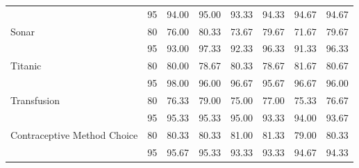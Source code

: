 \begin{table}[t]
\begin{tabular}{@{}lrrrrrrr@{}}
 & 95 & 94.00 & 95.00 & 93.33 & 94.33 & 94.67 & 94.67 \\[1pt]
Sonar & 80 & 76.00 & 80.33 & 73.67 & 79.67 & 71.67 & 79.67 \\
 & 95 & 93.00 & 97.33 & 92.33 & 96.33 & 91.33 & 96.33 \\[1pt]
Titanic & 80 & 80.00 & 78.67 & 80.33 & 78.67 & 81.67 & 80.67 \\
 & 95 & 98.00 & 96.00 & 96.67 & 95.67 & 96.67 & 96.00 \\[1pt]
Transfusion & 80 & 76.33 & 79.00 & 75.00 & 77.00 & 75.33 & 76.67 \\
 & 95 & 95.33 & 95.33 & 95.00 & 93.33 & 94.00 & 93.67 \\[1pt]
Contraceptive Method Choice & 80 & 80.33 & 80.33 & 81.00 & 81.33 & 79.00 & 80.33 \\
 & 95 & 95.67 & 95.33 & 93.33 & 93.33 & 94.67 & 94.33 \\
\hline
\end{tabular}
\endgroup
\end{table}
